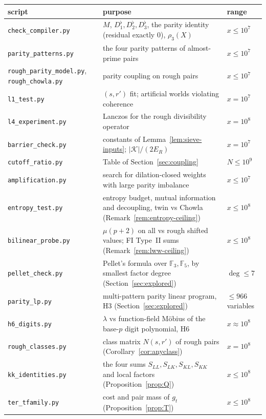 \begin{table}[h]
\centering
\small
\begin{tabular}{p{3.6cm}p{5.6cm}p{3.4cm}}
\toprule
script & purpose & range\\
\midrule
\texttt{check\_compiler.py} & $M$, $D_1^\flat,D_2^\flat,D_3^\flat$, the parity identity (residual exactly $0$), $\rho_3(X)$ & $x\le10^7$\\
\texttt{parity\_patterns.py} & the four parity patterns of almost-prime pairs & $x\le10^7$\\
\texttt{rough\_parity\_model.py}, \texttt{rough\_chowla.py} & parity coupling on rough pairs & $x\le10^7$\\
\texttt{l1\_test.py} & $(s,r')$ fit; artificial worlds violating coherence & $x=10^7$\\
\texttt{l4\_experiment.py} & Lanczos for the rough divisibility operator & $x=10^8$\\
\texttt{barrier\_check.py} & constants of Lemma~\ref{lem:sieve-inputs}; $|\mathcal K|/(2E_R)$ & $x=10^7$\\
\texttt{cutoff\_ratio.py} & Table of Section~\ref{sec:coupling} & $N\le10^9$\\
\texttt{amplification.py} & search for dilation-closed weights with large parity imbalance & $x\le10^7$\\
\texttt{entropy\_test.py} & entropy budget, mutual information and decoupling, twin vs Chowla (Remark~\ref{rem:entropy-ceiling}) & $x\le10^8$\\
\texttt{bilinear\_probe.py} & $\mu(p+2)$ on all vs rough shifted values; FI Type~II sums (Remark~\ref{rem:lww-ceiling}) & $x\le10^8$\\
\texttt{pellet\_check.py} & Pellet's formula over $\mathbb F_3,\mathbb F_5$, by smallest factor degree (Section~\ref{sec:explored}) & $\deg\le7$\\
\texttt{parity\_lp.py} & multi-pattern parity linear program, H3 (Section~\ref{sec:explored}) & $\le966$ variables\\
\texttt{h6\_digits.py} & $\lambda$ vs function-field M\"obius of the base-$p$ digit polynomial, H6 & $x\approx10^8$\\
\texttt{rough\_classes.py} & class matrix $N(s,r')$ of rough pairs (Corollary~\ref{cor:anyclass}) & $x=10^8$\\
\texttt{kk\_identities.py} & the four sums $S_{LL},S_{LK},S_{KL},S_{KK}$ and local factors (Proposition~\ref{prop:Q}) & $x\le10^8$\\
\texttt{ter\_tfamily.py} & cost and pair mass of $g_t$ (Proposition~\ref{prop:T}) & $x\le10^8$\\

\end{tabular}
\end{table}
